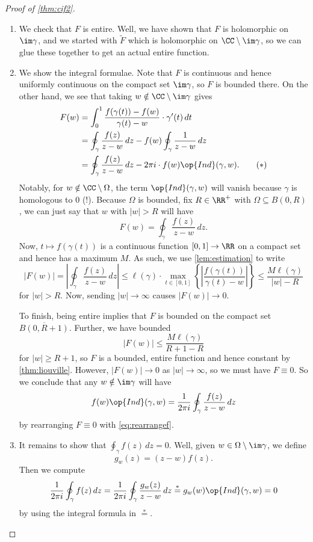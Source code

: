 \begin{proof}[Proof of \autoref{thm:cif2}]
\begin{enumerate}
		\item We check that $F$ is entire. Well, we have shown that $F$ is holomorphic on $\im\gamma$, and we started with $\widetilde F$ which is holomorphic on $\CC\setminus\im\gamma$, so we can glue these together to get an actual entire function.

		\item We show the integral formulae. Note that $F$ is continuous and hence uniformly continuous on the compact set $\im\gamma$, so $F$ is bounded there. On the other hand, we see that taking $w\notin\CC\setminus\im\gamma$ gives
		\begin{align*}
			F(w) &= \int_0^1\frac{f(\gamma(t))-f(w)}{\gamma(t)-w}\cdot\gamma'(t)\,dt \\
			&= \oint_\gamma\frac{f(z)}{z-w}\,dz-f(w)\oint_\gamma\frac1{z-w}\,dz \\
			&= \oint_\gamma\frac{f(z)}{z-w}\,dz-2\pi i\cdot f(w)\op{Ind}(\gamma,w).\tag{$*$}\label{eq:rearrangef}
		\end{align*}
		Notably, for $w\notin\CC\setminus\Omega$, the term $\op{Ind}(\gamma,w)$ will vanish because $\gamma$ is homologous to $0$ (!). Because $\Omega$ is bounded, fix $R\in\RR^+$ with $\Omega\subseteq B(0,R)$, we can just say that $w$ with $|w|>R$ will have
		\[F(w)=\oint_\gamma\frac{f(z)}{z-w}\,dz.\]
		Now, $t\mapsto f(\gamma(t))$ is a continuous function $[0,1]\to\RR$ on a compact set and hence has a maximum $M$. As such, we use \autoref{lem:estimation} to write
		\[|F(w)|=\left|\oint_\gamma\frac{f(z)}{z-w}\,dz\right|\le\ell(\gamma)\cdot\max_{t\in[0,1]}\left\{\left|\frac{f(\gamma(t))}{\gamma(t)-w}\right|\right\}\le\frac{M\ell(\gamma)}{|w|-R}\]
		for $|w|>R$. Now, sending $|w|\to\infty$ causes $|F(w)|\to0$.

		To finish, being entire implies that $F$ is bounded on the compact set $\overline{B(0,R+1)}$. Further, we have bounded
		\[|F(w)|\le\frac{M\ell(\gamma)}{R+1-R}\]
		for $|w|\ge R+1$, so $F$ is a bounded, entire function and hence constant by \autoref{thm:liouville}. However, $|F(w)|\to0$ as $|w|\to\infty$, so we must have $F\equiv0$. So we conclude that any $w\notin\im\gamma$ will have
		\[f(w)\op{Ind}(\gamma,w)=\frac1{2\pi i}\oint_\gamma\frac{f(z)}{z-w}\,dz\]
		by rearranging $F\equiv0$ with \autoref{eq:rearrangef}.

		\item It remains to show that $\oint_\gamma f(z)\,dz=0$. Well, given $w\in\Omega\setminus\im\gamma$, we define
		\[g_w(z)=(z-w)f(z).\]
		Then we compute
		\[\frac1{2\pi i}\oint_\gamma f(z)\,dz=\frac1{2\pi i}\oint_\gamma\frac{g_w(z)}{z-w}\,dz\stackrel*=g_w(w)\op{Ind}(\gamma,w)=0\]
		by using the integral formula in $\stackrel*=$.
		\qedhere
	\end{enumerate}
\end{proof}

